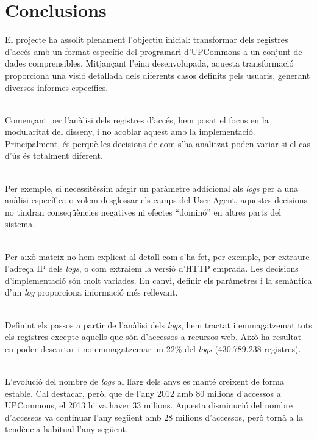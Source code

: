 \chapter*{Conclusions}\label{ch:conclusion}

El projecte ha assolit plenament l'objectiu inicial: transformar dels registres d'accés amb un format específic del programari d'\gls{UPCommons} a un conjunt de dades comprensibles.
Mitjançant l'eina desenvolupada, aquesta transformació proporciona una visió detallada dels diferents casos definits pels usuaris, generant diversos informes específics.

\noindent \\
Començant per l'anàlisi dels registres d'accés, hem posat el focus en la modularitat del disseny, i no acoblar aquest amb la implementació.
Principalment, és perquè les decisions de com s'ha analitzat poden variar si el cas d'ús és totalment diferent.

\noindent \\
Per exemple, si necessitéssim afegir un paràmetre addicional als \textit{\gls{log}s} per a una anàlisi específica o volem desglossar els camps del User Agent, aquestes decisions no tindran conseqüències negatives ni efectes ``dominó'' en altres parts del sistema.

\noindent \\
Per això mateix no hem explicat al detall com s'ha fet, per exemple, per extraure l'adreça IP dels \textit{\gls{log}s}, o com extraiem la versió d'\gls{HTTP} emprada.
Les decisions d'implementació són molt variades.
En canvi, definir els paràmetres i la semàntica d'un \textit{\gls{log}} proporciona informació més rellevant.

\noindent \\
Definint els passos a partir de l'anàlisi dels \textit{\gls{log}s}, hem tractat i emmagatzemat tots els registres excepte aquells que són d'accessos a recursos web.
Això ha resultat en poder descartar i no emmagatzemar un 22\% del \textit{\gls{log}s} (430.789.238 registres).

\noindent \\
L'evolució del nombre de \textit{\gls{log}s} al llarg dels anys es manté creixent de forma estable.
Cal destacar, però, que de l'any 2012 amb 80 milions d'accessos a \gls{UPCommons}, el 2013 hi va haver 33 milions.
Aquesta disminució del nombre d'accessos va continuar l'any següent amb 28 milions d'accessos, però tornà a la tendència habitual l'any següent.

